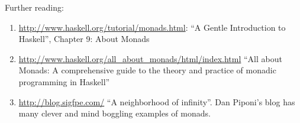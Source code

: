 \documentclass[a4paper,10pt]{article}
\begin{document}
% 
Further reading:
% 
\begin{enumerate}
\item  \url{http://www.haskell.org/tutorial/monads.html}:
  ``A Gentle Introduction to Haskell'', Chapter 9: About Monads
\item \url{http://www.haskell.org/all_about_monads/html/index.html}
  ``All about Monads: 
  A comprehensive guide to the theory and practice of monadic programming in Haskell''
\item \url{http://blog.sigfpe.com/}
  ``A neighborhood of infinity''.
  Dan Piponi's blog has many clever and mind boggling examples of monads.
\end{enumerate}
\end{document}
